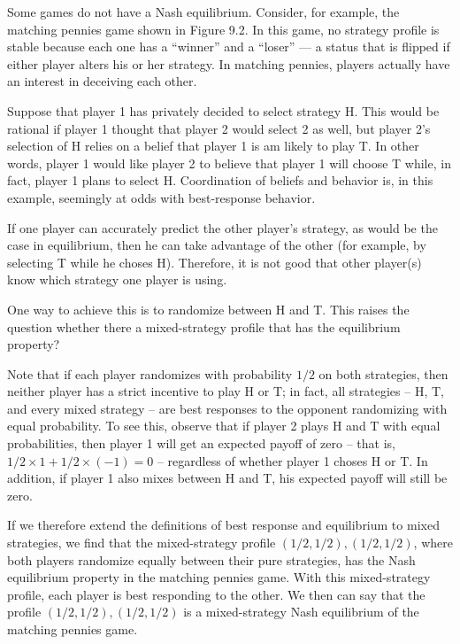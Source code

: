
Some games do not have a Nash equilibrium. Consider, for example, the matching pennies game shown in Figure 9.2. In this game, no strategy profile is stable because each one has a “winner” and a “loser” — a status that is flipped if either player alters his or her strategy. In matching pennies, players actually have an interest in deceiving each other. 

Suppose that player 1 has privately decided to select strategy H. This would be rational if player 1 thought that player 2 would select 2 as well, but player 2's selection of H relies on a belief that player 1 is am likely to play T. In other words, player 1 would like player 2 to believe that player 1 will choose T while, in fact, player 1 plans to select H. Coordination of beliefs and behavior is, in this example, seemingly at odds with best-response behavior.

If one player can accurately predict the other player's strategy, as would be the case in equilibrium, then he can take advantage of the other (for example, by selecting T while he choses H). Therefore, it is not good that other player(s) know which strategy one player is using.

One way to achieve this is to randomize between H and T. This raises the question whether there a mixed-strategy profile that has the equilibrium property?

Note that if each player randomizes with probability $1/2$ on both strategies, then neither player has a strict incentive to play H or T; in fact, all strategies -- H, T, and every mixed strategy -- are best responses to the opponent randomizing with equal probability. To see this, observe that if player 2 plays H and T with equal probabilities, then player 1 will get an expected payoff of zero -- that is, $1/2 \times 1 + 1/2 \times (-1) = 0$ -- regardless of whether player 1 choses H or T. In addition, if player 1 also mixes between H and T, his expected payoff will still be zero.

If we therefore extend the definitions of best response and equilibrium to mixed strategies, we find that the mixed-strategy profile $(1/2, 1/2), (1/2, 1/2)$, where both players randomize equally between their pure strategies, has the Nash equilibrium property in the matching pennies game. With this mixed-strategy profile, each player is best responding to the other. We then can say that the profile $(1/2, 1/2), (1/2, 1/2)$ is a mixed-strategy Nash equilibrium of the matching pennies game.

